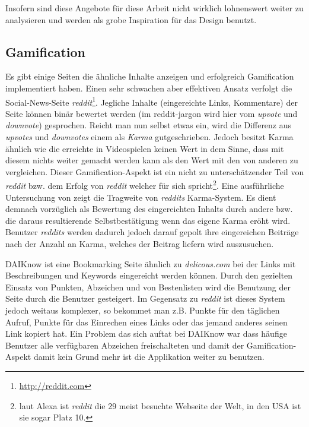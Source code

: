 \documentclass[12pt,twoside]{book}
\begin{document}
Insofern sind diese Angebote für diese Arbeit nicht wirklich lohnenswert weiter zu analysieren und werden als grobe Inspiration für das Design benutzt.

\subsection {Gamification}

Es gibt einige Seiten die ähnliche Inhalte anzeigen und erfolgreich Gamification implementiert haben. Einen sehr schwachen aber effektiven Ansatz verfolgt die Social-News-Seite \textit{reddit}\footnote{\url{http://reddit.com}}. Jegliche Inhalte (eingereichte Links, Kommentare) der Seite können binär bewertet werden (im reddit-jargon wird hier vom \textit{upvote} und \textit{downvote}) gesprochen. Reicht man nun selbst etwas ein, wird die Differenz aus \textit{upvotes} und \textit{downvotes} einem als \textit{Karma} gutgeschrieben. Jedoch besitzt Karma ähnlich wie die erreichte in Videospielen keinen Wert in dem Sinne, dass mit diesem nichts weiter gemacht werden kann als den Wert mit den von anderen zu vergleichen.
Dieser Gamification-Aspekt ist ein nicht zu unterschätzender Teil von \textit{reddit} bzw. dem Erfolg von \textit{reddit} welcher für sich spricht\footnote{laut Alexa ist \textit{reddit} die 29 meist besuchte Webseite der Welt, in den USA ist sie sogar Platz 10.}.
Eine ausführliche Untersuchung von \citep{richterichkarma} zeigt die Tragweite von \textit{reddits} Karma-System. Es dient demnach vorzüglich als Bewertung des eingereichten Inhalts durch andere bzw. die daraus resultierende Selbstbestätigung wenn das eigene Karma eröht wird.
Benutzer \textit{reddits} werden dadurch jedoch darauf gepolt ihre eingereichen Beiträge nach der Anzahl an Karma, welches der Beitrag liefern wird auszusuchen.

DAIKnow \citep{meder2014daiknow} ist eine Bookmarking Seite ähnlich zu \textit{delicous.com} bei der Links mit Beschreibungen und Keywords eingereicht werden können. Durch den gezielten Einsatz von Punkten, Abzeichen und von Bestenlisten wird die Benutzung der Seite durch die Benutzer gesteigert. Im Gegensatz zu \textit{reddit} ist dieses System jedoch weitaus komplexer, so bekommet man z.B. Punkte für den täglichen Aufruf, Punkte für das Einrechen eines Links oder das jemand anderes seinen Link kopiert hat.
Ein Problem das sich auftat bei DAIKnow war dass häufige Benutzer alle verfügbaren Abzeichen freischalteten und damit der Gamification-Aspekt damit kein Grund mehr ist die Applikation weiter zu benutzen.
\end{document}
